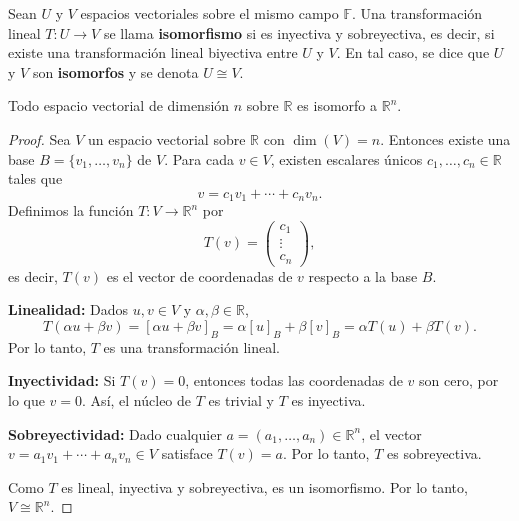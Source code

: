 \begin{definition}[Isomorfismo]
Sean $U$ y $V$ espacios vectoriales sobre el mismo campo $\mathbb{F}$. Una transformación lineal $T: U \to V$ se llama \textbf{isomorfismo} si es inyectiva y sobreyectiva, es decir, si existe una transformación lineal biyectiva entre $U$ y $V$. En tal caso, se dice que $U$ y $V$ son \textbf{isomorfos} y se denota $U \cong V$.
\end{definition}

\begin{theorem}
Todo espacio vectorial de dimensión $n$ sobre $\mathbb{R}$ es isomorfo a $\mathbb{R}^n$.
\begin{proof}
Sea $V$ un espacio vectorial sobre $\mathbb{R}$ con $\dim(V) = n$. Entonces existe una base $B = \{v_1, \ldots, v_n\}$ de $V$. Para cada $v \in V$, existen escalares únicos $c_1, \ldots, c_n \in \mathbb{R}$ tales que
\[
v = c_1 v_1 + \cdots + c_n v_n.
\]
Definimos la función $T: V \to \mathbb{R}^n$ por
\[
T(v) = \begin{pmatrix} c_1 \\ \vdots \\ c_n \end{pmatrix},
\]
es decir, $T(v)$ es el vector de coordenadas de $v$ respecto a la base $B.$

\textbf{Linealidad:} Dados $u, v \in V$ y $\alpha, \beta \in \mathbb{R}$,
\[
T(\alpha u + \beta v) = [\alpha u + \beta v]_B = \alpha [u]_B + \beta [v]_B = \alpha T(u) + \beta T(v).
\]
Por lo tanto, $T$ es una transformación lineal.

\textbf{Inyectividad:} Si $T(v) = 0$, entonces todas las coordenadas de $v$ son cero, por lo que $v = 0$. Así, el núcleo de $T$ es trivial y $T$ es inyectiva.

\textbf{Sobreyectividad:} Dado cualquier $a = (a_1, \ldots, a_n) \in \mathbb{R}^n$, el vector $v = a_1 v_1 + \cdots + a_n v_n \in V$ satisface $T(v) = a$. Por lo tanto, $T$ es sobreyectiva.

Como $T$ es lineal, inyectiva y sobreyectiva, es un isomorfismo. Por lo tanto, $V \cong \mathbb{R}^n.$
\end{proof}
\end{theorem}

